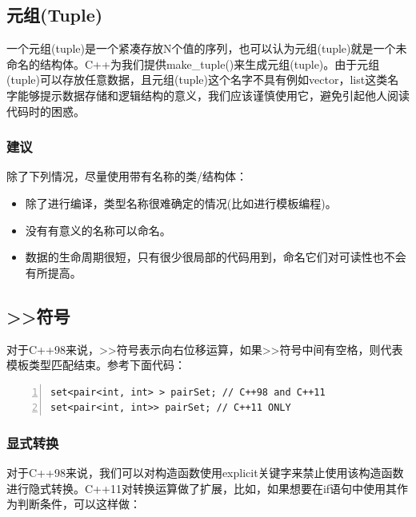 \documentclass{ctexart}
\begin{document}
\subsection{元组(Tuple)}

一个元组(tuple)是一个紧凑存放N个值的序列，也可以认为元组(tuple)就是一个未命名的结构体。C++为我们提供make\_tuple()来生成元组(tuple)。由于元组(tuple)可以存放任意数据，且元组(tuple)这个名字不具有例如vector，list这类名字能够提示数据存储和逻辑结构的意义，我们应该谨慎使用它，避免引起他人阅读代码时的困惑。

\subsubsection*{建议}

除了下列情况，尽量使用带有名称的类/结构体：

\begin{itemize}
	\item 除了进行编译，类型名称很难确定的情况(比如进行模板编程)。
	\item 没有有意义的名称可以命名。
	\item 数据的生命周期很短，只有很少很局部的代码用到，命名它们对可读性也不会有所提高。
\end{itemize}

\subsection{>>符号}

对于C++98来说，>>符号表示向右位移运算，如果>>符号中间有空格，则代表模板类型匹配结束。参考下面代码：

\begin{lstlisting}[language={[ANSI]C},keywordstyle=\color{blue!70},commentstyle=\color{red!50!green!50!blue!50},frame=shadowbox, rulesepcolor=\color{red!20!green!20!blue!20},basicstyle=\small,numbers=left, numberstyle=\tiny,breaklines=true]
set<pair<int, int> > pairSet; // C++98 and C++11  
set<pair<int, int>> pairSet; // C++11 ONLY
\end{lstlisting}

\subsubsection*{显式转换}

对于C++98来说，我们可以对构造函数使用explicit关键字来禁止使用该构造函数进行隐式转换。C++11对转换运算做了扩展，比如，如果想要在if语句中使用其作为判断条件，可以这样做：
\end{document}
